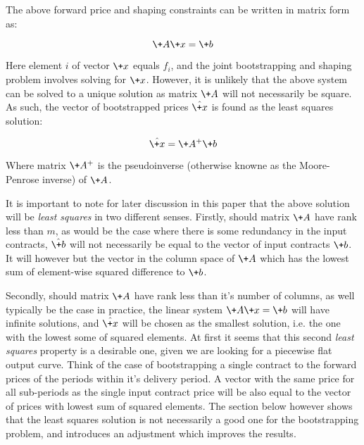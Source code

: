 \documentclass{article}
\begin{document}
The above forward price and shaping constraints can be written in matrix form as:

\begin{equation}
    \+A\+x = \+b
\end{equation}

Here element $i$ of vector $\+x$ equals $f_i$, and the joint bootstrapping and shaping
problem involves solving for $\+x$. However, it is unlikely that the above system can
be solved to a unique solution as matrix $\+A$ will not necessarily be square. As
such, the vector of bootstrapped prices $\hat{\+x}$ is found as the least squares
solution:

\begin{equation}
    \hat{\+x} = \+A^+\+b
\end{equation}

Where matrix $\+A^+$ is the pseudoinverse (otherwise knowne as the Moore-Penrose inverse)
of $\+A$.

\bigskip

It is important to note for later discussion in this paper that the above solution will be 
\emph{least squares} in two different senses. Firstly, should matrix $\+A$ have rank less
than $m$, as would be the case where there is some redundancy in the input contracts,
$\hat{\+b}$ will not necessarily be equal to the vector of input contracts $\+b$. It
will however but the vector in the column space of $\+A$ which has the lowest sum of 
element-wise squared difference to $\+b$.

Secondly, should matrix $\+A$ have rank less
than it's number of columns, as well typically be the case in practice, the linear 
system $\+A\+x = \+b$ will have infinite solutions, and $\hat{\+x}$ will be chosen
as the smallest solution, i.e. the one with the lowest some of squared elements.
At first it seems that this second \emph{least squares} property is a desirable one,
given we are looking for a piecewise flat output curve. Think of the case of bootstrapping
a single contract to the forward prices of the periods within it's delivery period. A
vector with the same price for all sub-periods as the single input contract price will 
be also equal to the vector of prices with lowest sum of squared elements. The section 
below however shows that the least squares solution is not necessarily a 
good one for the bootstrapping problem, and introduces an adjustment which improves
the results.

\end{document}
